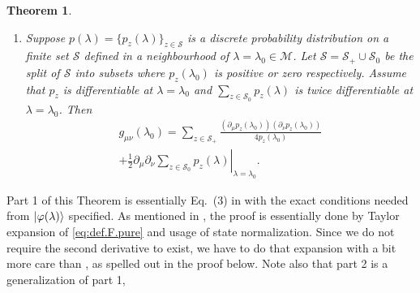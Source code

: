 \documentclass[american,aps,pra,reprint,floatfix,nofootinbib,superscriptaddress]{revtex4-2}
\DeclareMathOperator{\rank}{rank}
\DeclareMathOperator{\real}{Re}
\newtheorem{theorem}{Theorem}
\newcommand{\bes} {\begin{subequations}}
\newcommand{\ees} {\end{subequations}}
\newcommand{\beq} {\begin{equation}}
\newcommand{\eeq} {\end{equation}}
\begin{document}
\begin{theorem}
\begin{enumerate}
\beq
        \label{eq:g2bound}
\real\left(
          P_0 \left(\partial_\mu\rho(\lambda_0)\right)
          P_{+}^{\dagger} \left(\rho_{+}(\lambda_0)\right)^{-1}
          P_{+} \left(\partial_\nu\rho(\lambda_0)\right) P_0^{\dagger}
        \right).
\eeq
      If the bound is not an equality along some vector $\phi$ tangent to
      $\mathcal{M}$ at $\lambda_0\in\mathcal{M}$ then $\rank(\rho(\lambda))$
      is larger than $\rank(\rho(\lambda_0))$ in some punctured neighbourhood
      of $\lambda_0$ (i.e., the neighbourhood
      excluding the point $\lambda_0$ itself) along the direction $\phi$.
    \item Suppose $p(\lambda) = \{p_z(\lambda)\}_{z \in \mathcal{S}}$
      is a discrete probability distribution on a finite set $\mathcal{S}$
      defined in a neighbourhood of $\lambda = \lambda_0 \in \mathcal{M}$.
      Let $\mathcal{S} = \mathcal{S}_{+} \cup \mathcal{S}_0$ be the split
      of $\mathcal{S}$ into subsets where $p_z(\lambda_0)$ is positive
      or zero respectively. Assume that $p_z$ 
      is differentiable
      at $\lambda = \lambda_0$ and $\sum_{z\in\mathcal{S}_0} p_z(\lambda)$
is twice differentiable at $\lambda = \lambda_0$. Then
\bes
        \label{eq:gmunu.c}
      \begin{align}
        \label{eq:gmunu.c-a}
        g_{\mu\nu}(\lambda_0) = \sum_{z\in\mathcal{S}_{+}}
        \frac{
          \left(\partial_{\mu} p_z(\lambda_0)\right)
          \left(\partial_{\nu} p_z(\lambda_0)\right)
        }{
          4 p_z(\lambda_0)
        } \\
         \label{eq:gmunu.c-b}
       + \frac12 \left.\partial_{\mu} \partial_{\nu}
          \sum_{z\in\mathcal{S}_0} p_z(\lambda)\right|_{\lambda = \lambda_0}.
      \end{align}
      \ees
  \end{enumerate}
\end{theorem}
Part 1 of this Theorem
is essentially Eq.~(3) in \cite{zanardi2007information}
with the exact conditions needed from $\ket{\varphi(\lambda)}$
specified. As mentioned in \cite{zanardi2007information},
the proof is essentially done by Taylor expansion of \eqref{eq:def.F.pure}
and usage of state normalization.
Since we do
not require the second derivative to exist, we have to do that expansion
with a bit more care than \cite{zanardi2007information}, as spelled out
in the proof below. Note also that part 2 is a generalization of part 1,
\end{document}
